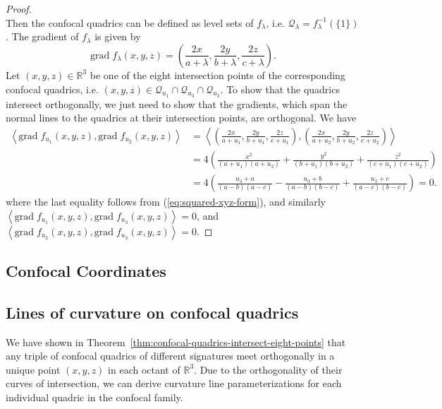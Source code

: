 \documentclass[10pt, a4paper]{article}
\theoremstyle{BoldTopSpacing}
\theoremstyle{BoldTopSpacing}
\theoremstyle{BoldTopSpacing}
\theoremstyle{BoldTopBottomSpacing}
\theoremstyle{BoldTopSpacing}
\theoremstyle{BoldTopBottomSpacing}
\theoremstyle{remark}
\begin{document}
\begin{proof}
\[\]
Then the confocal quadrics can be defined as level sets of $f_{\lambda}$, i.e. $\mathcal{Q}_{\lambda} = f^{-1}_{\lambda}(\{1\})$. The gradient of $f_{\lambda}$ is given by
\[
    \text{grad} \; f_{\lambda}(x, y, z) = \left( \frac{2x}{a + \lambda}, \frac{2y}{b + \lambda}, \frac{2z}{c + \lambda} \right).
\]
Let $(x, y, z) \in \mathbb{R}^3$ be one of the eight intersection points of the corresponding confocal quadrics, i.e. $(x, y, z) \in \mathcal{Q}_{u_{1}} \cap \mathcal{Q}_{u_{3}} \cap \mathcal{Q}_{u_{3}}$. To show that the quadrics intersect orthogonally, we just need to show that the gradients, which span the normal lines to the quadrics at their intersection points, are orthogonal. We have
\begin{align*}
\left< \text{grad} \; f_{u_{1}}(x, y, z), \text{grad} \; f_{u_{2}}(x, y, z)  \right> &= \left< \left( \frac{2x}{a + u_{1}}, \frac{2y}{b + u_{1}}, \frac{2z}{c + u_{1}} \right), \left( \frac{2x}{a + u_{2}}, \frac{2y}{b + u_{2}}, \frac{2z}{c + u_{2}} \right) \right>  \\
&= 4 \left( \frac{x^2}{(a + u_{1})(a + u_{2})} + \frac{y^2}{(b + u_{1})(b + u_{2})} + \frac{z^2}{(c + u_{1})(c + u_{2})} \right) \\
&= 4 \left( \frac{u_{3} + a}{(a - b)(a - c)} - \frac{u_{3} + b}{(a - b)(b - c)} + \frac{u_{3} + c}{(a - c)(b - c)} \right) = 0.
\end{align*}
where the last equality follows from (\ref{eq:squared-xyz-form}), and similarly $\left< \text{grad} \; f_{u_{1}}(x, y, z), \text{grad} \; f_{u_{3}}(x, y, z)  \right> = 0$, and $\left< \text{grad} \; f_{u_{2}}(x, y, z), \text{grad} \; f_{u_{3}}(x, y, z)  \right> = 0$.
\end{proof}

\subsection{Confocal Coordinates}
\label{subsec:confocal-coordinates}

\subsection{Lines of curvature on confocal quadrics}
\label{subsec:curvature-lines-on-quadrics}
We have shown in Theorem~\ref{thm:confocal-quadrics-intersect-eight-points} that any triple of confocal quadrics of different signatures meet orthogonally in a unique point $(x, y, z)$ in each octant of $\mathbb{R}^3$. Due to the orthogonality of their curves of intersection, we can derive curvature line parameterizations for each individual quadric in the confocal family.
\end{document}
